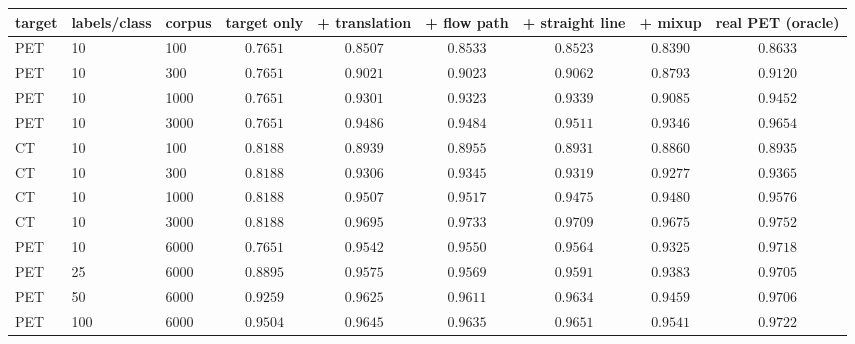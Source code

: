 \begin{tabular}{lllcccccc}
\toprule
target & labels/class & corpus & target only & + translation & + flow path & + straight line & + mixup & real PET (oracle) \\
\midrule
PET & 10 & 100 & $0.7651$ & $0.8507$ & $0.8533$ & $0.8523$ & $0.8390$ & $0.8633$ \\
PET & 10 & 300 & $0.7651$ & $0.9021$ & $0.9023$ & $0.9062$ & $0.8793$ & $0.9120$ \\
PET & 10 & 1000 & $0.7651$ & $0.9301$ & $0.9323$ & $0.9339$ & $0.9085$ & $0.9452$ \\
PET & 10 & 3000 & $0.7651$ & $0.9486$ & $0.9484$ & $0.9511$ & $0.9346$ & $0.9654$ \\
CT & 10 & 100 & $0.8188$ & $0.8939$ & $0.8955$ & $0.8931$ & $0.8860$ & $0.8935$ \\
CT & 10 & 300 & $0.8188$ & $0.9306$ & $0.9345$ & $0.9319$ & $0.9277$ & $0.9365$ \\
CT & 10 & 1000 & $0.8188$ & $0.9507$ & $0.9517$ & $0.9475$ & $0.9480$ & $0.9576$ \\
CT & 10 & 3000 & $0.8188$ & $0.9695$ & $0.9733$ & $0.9709$ & $0.9675$ & $0.9752$ \\
PET & 10 & 6000 & $0.7651$ & $0.9542$ & $0.9550$ & $0.9564$ & $0.9325$ & $0.9718$ \\
PET & 25 & 6000 & $0.8895$ & $0.9575$ & $0.9569$ & $0.9591$ & $0.9383$ & $0.9705$ \\
PET & 50 & 6000 & $0.9259$ & $0.9625$ & $0.9611$ & $0.9634$ & $0.9459$ & $0.9706$ \\
PET & 100 & 6000 & $0.9504$ & $0.9645$ & $0.9635$ & $0.9651$ & $0.9541$ & $0.9722$ \\
\bottomrule
\end{tabular}
